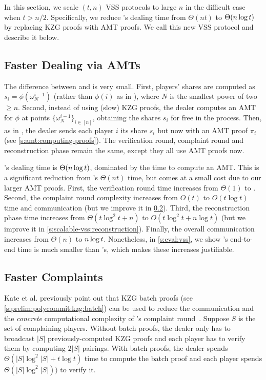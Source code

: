 In this section, we scale $(t,n)$ VSS protocols to large $n$ in the difficult case when $t > n/2$.
Specifically, we reduce \evss's dealing time from $\Theta(nt)$ to $\Theta(n\log{t})$ by replacing KZG proofs with AMT proofs.
We call this new VSS protocol \ourvss and describe it below.

\subsection{Faster Dealing via AMTs}
\label{s:scalable-vss:overview}
The difference between \ourvss and \evss is very small.
First, players' shares are computed as $s_i = \phi(\omega_N^{i-1})$ (rather than $\phi(i)$ as in \evss), where $N$ is the smallest power of two $\ge n$.
Second, instead of using (slow) KZG proofs, the dealer computes an AMT for $\phi$ at points $\{\omega_N^{i-1}\}_{i\in[n]}$, obtaining the shares $s_i$ for free in the process.
Then, as in \evss, the dealer sends each player $i$ its share $s_i$ but now with an AMT proof $\pi_i$ (see \cref{s:amt:computing-proofs}).
The verification round, complaint round and reconstruction phase remain the same, except they all use AMT proofs now.

\ourvss's dealing time is $\Theta(n\log{t})$, dominated by the time to compute an AMT.
This is a significant reduction from \evss's $\Theta(nt)$ time, but comes at a small cost due to our larger AMT proofs.
First, the verification round time increases from $\Theta(1)$ to \amtOneShareVerifTime.
Second, the complaint round complexity increases from $O(t)$ to $O(t\log{t})$ time and communication (but we improve it in \cref{s:scalable-vss:batch-complaints}).
Third, the reconstruction phase time increases from $\Theta(t\log^2{t} + n)$ to $O(t\log^2{t} + n\log{t})$  (but we improve it in \cref{s:scalable-vss:reconstruction}).
Finally, the overall communication increases from $\Theta(n)$ to $n\log{t}$.
Nonetheless, in \cref{s:eval:vss}, we show \ourvss's end-to-end time is much smaller than \evss's, which makes these increases justifiable.

\subsection{Faster Complaints}
\label{s:scalable-vss:batch-complaints}
Kate et al. previously point out that KZG batch proofs (see \cref{s:prelim:polycommit:kzg:batch}) can be used to reduce the communication and the \textit{concrete} computational complexity of \evss's complaint round~\cite{KZG10a}.
Suppose $S$ is the set of complaining players.
Without batch proofs, the dealer only has to broadcast $|S|$ previously-computed KZG proofs and each player has to verify them by computing $2|S|$ pairings.
With batch proofs, the dealer spends $\Theta(|S|\log^2{|S|}+t\log{t})$ time to compute the batch proof and each player spends $\Theta(|S|\log^2{|S|}))$ to verify it.

